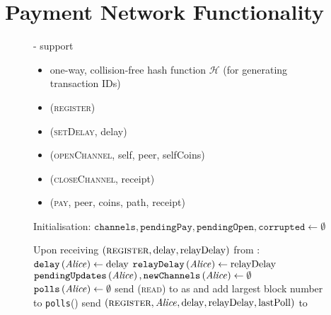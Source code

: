 \section{Payment Network Functionality}
  \begin{figure}[H]
    \begin{systembox}{\fpaynet - support}
        \begin{itemize}
          \item one-way, collision-free hash function $\mathcal{H}$ (for
          generating transaction IDs)
        \end{itemize}

        \begin{itemize}
          \item (\textsc{register})
          \item (\textsc{setDelay}, delay)
          \item (\textsc{openChannel}, self, peer, selfCoins)
          \item (\textsc{closeChannel}, receipt)
          \item (\textsc{pay}, peer, coins, path, receipt)
        \end{itemize}

      \begin{algorithmic}[1]
        \State Initialisation:
        \Indent
          \State $\mathtt{channels}, \mathtt{pendingPay}, \mathtt{pendingOpen},
          \mathtt{corrupted} \gets \emptyset$
        \EndIndent
        \Statex

        \State Upon receiving $\left(\textsc{register}, \mathrm{delay},
        \mathrm{relayDelay}\right)$ from \alice:
        \Indent
          \State $\mathtt{delay}\left(\mathit{Alice}\right) \gets \mathrm{delay}$
          \State $\mathtt{relayDelay}\left(\mathit{Alice}\right) \gets
          \mathrm{relayDelay}$
          \State $\mathtt{pendingUpdates}\left(\mathit{Alice}\right),
          \mathtt{newChannels}\left(\mathit{Alice}\right) \gets \emptyset$
          \State $\mathtt{polls}\left(\mathit{Alice}\right) \gets \emptyset$
          \State send (\textsc{read}) to \ledger{} as \alice{} and add largest
          block number to \texttt{polls}(\alice)
          \label{alg:fpaynet:support:lastpoll}
          \State send $\left(\textsc{register}, \mathit{Alice}, \mathrm{delay},
          \mathrm{relayDelay}, \mathrm{lastPoll}\right)$ to \simulator
        \EndIndent
        \Statex


\end{algorithmic}
\end{systembox}
\end{figure}

